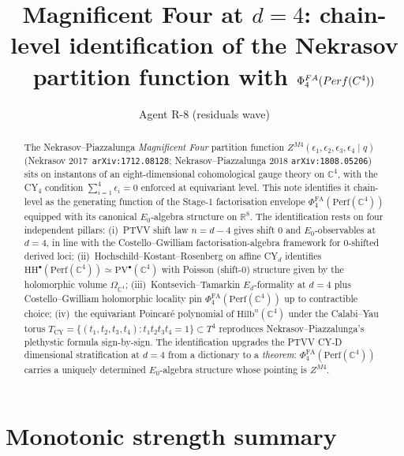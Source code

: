 \documentclass[11pt]{article}
\title{Magnificent Four at $d = 4$: chain-level identification of the
Nekrasov partition function with
$\PhiFA_4(\Perf(\C^4))$}
\author{Agent R-8 (residuals wave)}
\date{}
\providecommand{\C}{\mathbb{C}}
\providecommand{\R}{\mathbb{R}}
\providecommand{\Perf}{\mathrm{Perf}}
\providecommand{\Hilb}{\mathrm{Hilb}}
\providecommand{\Ezero}{E_0}
\providecommand{\PV}{\mathrm{PV}}
\providecommand{\HH}{\mathrm{HH}}
\providecommand{\PhiFA}{\Phi^{\mathrm{FA}}}
\theoremstyle{definition}
\begin{document}
\maketitle

\begin{abstract}
The Nekrasov--Piazzalunga \emph{Magnificent Four} partition function
$Z^{M4}(\epsilon_1,\epsilon_2,\epsilon_3,\epsilon_4 \mid q)$
(Nekrasov 2017~\texttt{arXiv:1712.08128}; Nekrasov--Piazzalunga 2018
\texttt{arXiv:1808.05206}) sits on instantons of an
eight-dimensional cohomological gauge theory on $\C^4$, with the CY$_4$
condition
$\sum_{i=1}^{4}\epsilon_i = 0$ enforced at equivariant
level. This note identifies it chain-level as the generating function
of the Stage-1 factorisation envelope
$\PhiFA_4(\Perf(\C^4))$ equipped with its canonical
$\Ezero$-algebra structure on $\R^8$. The identification rests on four
independent pillars: (i)~PTVV shift law $n = d - 4$ gives shift $0$ and
$\Ezero$-observables at $d = 4$, in line with the Costello--Gwilliam
factorisation-algebra framework for $0$-shifted derived loci;
(ii)~Hochschild--Kostant--Rosenberg on affine CY$_d$ identifies
$\HH^\bullet(\Perf(\C^4)) \simeq \PV^\bullet(\C^4)$ with Poisson
(shift-$0$) structure given by the holomorphic volume
$\Omega_{\C^4}$; (iii)~Kontsevich--Tamarkin $E_d$-formality at $d = 4$
plus Costello--Gwilliam holomorphic locality pin $\PhiFA_4(\Perf(\C^4))$
up to contractible choice; (iv)~the equivariant Poincar\'e polynomial
of $\Hilb^n(\C^4)$ under the Calabi--Yau torus
$T_{\mathrm{CY}} = \{(t_1,t_2,t_3,t_4) : t_1 t_2 t_3 t_4 = 1\} \subset T^4$
reproduces Nekrasov--Piazzalunga's plethystic formula sign-by-sign.
The identification upgrades the PTVV CY-D dimensional stratification
at $d = 4$ from a dictionary to a \emph{theorem}:
$\PhiFA_4(\Perf(\C^4))$ carries a uniquely determined
$\Ezero$-algebra structure whose pointing is $Z^{M4}$.
\end{abstract}

\tableofcontents

\section{Monotonic strength summary}
\label{sec:mono-summary}
\end{document}
